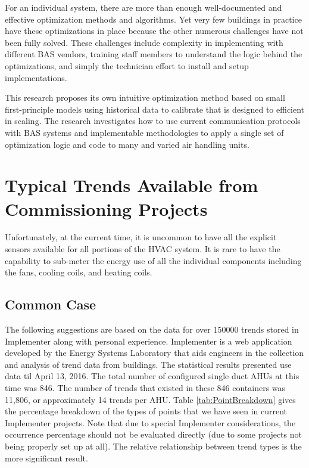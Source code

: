For an individual system, there are more than enough well-documented and
effective optimization methods and algorithms. Yet very few buildings in
practice have these optimizations in place because the other numerous
challenges have not been fully solved. These challenges include
complexity in implementing with different BAS vendors, training staff
members to understand the logic behind the optimizations, and simply the
technician effort to install and setup implementations.

This research proposes its own intuitive optimization method based on
small first-principle models using historical data to calibrate that is
designed to efficient in scaling. The research investigates how to use
current communication protocols with BAS systems and implementable
methodologies to apply a single set of optimization logic and code to
many and varied air handling units. 

\section{Typical Trends Available from Commissioning Projects}

Unfortunately, at the current time, it is uncommon to have all the
explicit sensors available for all portions of the HVAC system.  It is
rare to have the capability to sub-meter the energy use of all the
individual components including the fans, cooling coils, and heating
coils. 

\subsection{Common Case}

The following suggestions are based on the data for over \num{150000}
trends stored in Implementer along with personal experience. Implementer
is a web application developed by the Energy Systems Laboratory that
aids engineers in the collection and analysis of trend data from
buildings.  The statistical results presented use data til April 13,
2016. The total number of configured single duct AHUs at this time was
846. The number of trends that existed in these 846 containers was
11,806, or approximately 14 trends per AHU. Table
\ref{tab:PointBreakdown} gives the percentage breakdown of the types of
points that we have seen in current Implementer projects. Note that due
to special Implementer considerations, the occurrence percentage
should not be evaluated directly (due to some projects not being
properly set up at all). The relative relationship between trend types is
the more significant result.  


